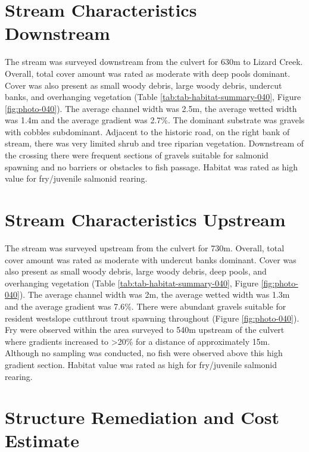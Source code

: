 \documentclass[
]{book}
\begin{document}
\hypertarget{stream-characteristics-downstream-4}{%
\section*{Stream Characteristics Downstream}\label{stream-characteristics-downstream-4}}

The stream was surveyed downstream from the culvert for 630m to Lizard Creek. Overall, total cover amount was rated as moderate with deep pools dominant. Cover was also present as small woody debris, large woody debris, undercut banks, and overhanging vegetation (Table \ref{tab:tab-habitat-summary-040}, Figure \ref{fig:photo-040}). The average channel width was 2.5m, the average wetted width was 1.4m and the average gradient was 2.7\%. The dominant substrate was gravels with cobbles subdominant. Adjacent to the historic road, on the right bank of stream, there was very limited shrub and tree riparian vegetation. Downstream of the crossing there were frequent sections of gravels suitable for salmonid spawning and no barriers or obstacles to fish passage. Habitat was rated as high value for fry/juvenile salmonid rearing.

\hypertarget{stream-characteristics-upstream-4}{%
\section*{Stream Characteristics Upstream}\label{stream-characteristics-upstream-4}}

The stream was surveyed upstream from the culvert for 730m. Overall, total cover amount was rated as moderate with undercut banks dominant. Cover was also present as small woody debris, large woody debris, deep pools, and overhanging vegetation (Table \ref{tab:tab-habitat-summary-040}, Figure \ref{fig:photo-040}). The average channel width was 2m, the average wetted width was 1.3m and the average gradient was 7.6\%. There were abundant gravels suitable for resident westslope cutthrout trout spawning throughout (Figure \ref{fig:photo-040}). Fry were observed within the area surveyed to 540m upstream of the culvert where gradients increased to \textgreater20\% for a distance of approximately 15m. Although no sampling was conducted, no fish were observed above this high gradient section. Habitat value was rated as high for fry/juvenile salmonid rearing.

\hypertarget{structure-remediation-and-cost-estimate-5}{%
\section*{Structure Remediation and Cost Estimate}\label{structure-remediation-and-cost-estimate-5}}
\end{document}
